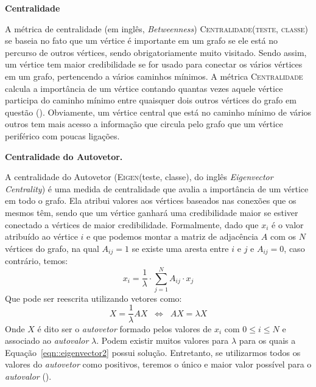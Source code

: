 \begin{description}
\item{\textbf{Centralidade}}
\label{item::constraint}

A métrica de centralidade (em inglês, \textit{Betweenness}) \textsc{Centralidade(teste, classe)} se baseia no fato que um vértice é importante em um grafo se ele está no percurso de outros vértices, sendo obrigatoriamente muito visitado. Sendo assim, um vértice tem maior credibilidade se for usado para conectar os vários vértices em um grafo, pertencendo a vários caminhos mínimos.
A métrica \textsc{Centralidade} calcula a importância de um vértice contando quantas vezes aquele vértice participa do caminho mínimo entre quaisquer dois outros vértices do grafo em questão (\cite{Sabidussi66}). Obviamente, um vértice central que está no caminho mínimo de vários outros tem mais acesso a informação que circula pelo grafo que um vértice periférico com poucas ligações.

\item{\textbf{Centralidade do Autovetor.}}
\label{item::eigenvector}

A centralidade do Autovetor (\textsc{Eigen}(teste, classe), do inglês \textit{Eigenvector Centrality}) é uma medida de centralidade que avalia a importância de um vértice em todo o grafo. Ela atribui valores aos vértices baseados nas conexões que os mesmos têm, sendo que um vértice ganhará uma credibilidade maior se estiver conectado a vértices de maior credibilidade. Formalmente, dado que $x_i$ é o valor atribuído ao vértice $i$ e que podemos montar a matriz de adjacência $A$ com os $N$ vértices do grafo, na qual $A_{ij} = 1$ se existe uma aresta entre $i$ e $j$ e $A_{ij}=0$, caso contrário, temos:
\begin{equation}\label{eqn::eigenvector1}
   x_i = \frac{1}{\lambda} \cdot \sum\limits_{j=1}^{N} A_{ij} \cdot x_j
\end{equation}
Que pode ser reescrita utilizando vetores como:
\begin{equation}\label{eqn::eigenvector2}
   X = \frac{1}{\lambda} AX  \;\; \Longleftrightarrow\;\;  AX = \lambda X
\end{equation}
Onde $X$ é dito ser o \textit{autovetor} formado pelos valores de $x_i$ com $0 \leq i \leq N$ e associado ao \textit{autovalor} $\lambda$. Podem existir muitos valores para $\lambda$ para os quais a Equação~\ref{eqn::eigenvector2} possui solução. Entretanto, se utilizarmos todos os valores do \textit{autovetor} como positivos, teremos o único e maior valor possível para o \textit{autovalor} (\cite{Newman10}). 


\end{description}
